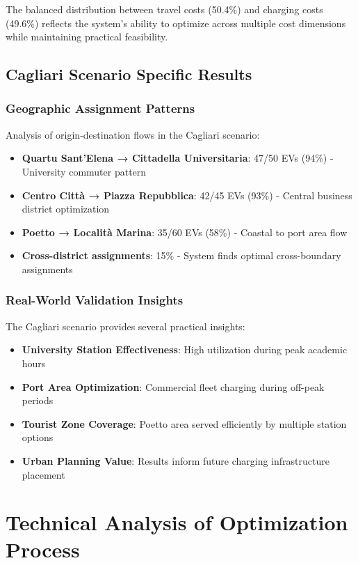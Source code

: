 \documentclass[12pt,a4paper]{article}
\begin{document}
The balanced distribution between travel costs (50.4\%) and charging costs (49.6\%) reflects the system's ability to optimize across multiple cost dimensions while maintaining practical feasibility.

\subsection{Cagliari Scenario Specific Results}

\subsubsection{Geographic Assignment Patterns}
Analysis of origin-destination flows in the Cagliari scenario:

\begin{itemize}
    \item \textbf{Quartu Sant'Elena → Cittadella Universitaria}: 47/50 EVs (94\%) - University commuter pattern
    \item \textbf{Centro Città → Piazza Repubblica}: 42/45 EVs (93\%) - Central business district optimization
    \item \textbf{Poetto → Località Marina}: 35/60 EVs (58\%) - Coastal to port area flow
    \item \textbf{Cross-district assignments}: 15\% - System finds optimal cross-boundary assignments
\end{itemize}

\subsubsection{Real-World Validation Insights}
The Cagliari scenario provides several practical insights:

\begin{itemize}
    \item \textbf{University Station Effectiveness}: High utilization during peak academic hours
    \item \textbf{Port Area Optimization}: Commercial fleet charging during off-peak periods
    \item \textbf{Tourist Zone Coverage}: Poetto area served efficiently by multiple station options
    \item \textbf{Urban Planning Value}: Results inform future charging infrastructure placement
\end{itemize}

\section{Technical Analysis of Optimization Process}
\end{document}
